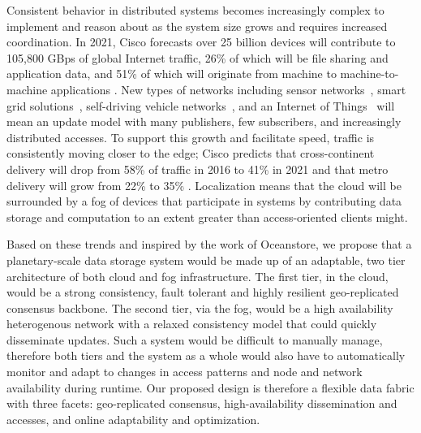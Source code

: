Consistent behavior in distributed systems becomes increasingly complex to implement and reason about as the system size grows and requires increased coordination.
In 2021, Cisco forecasts over 25 billion devices will contribute to 105,800 GBps of global Internet traffic, 26\% of which will be file sharing and application data, and 51\% of which will originate from machine to machine-to-machine applications \cite{cisco_internet_trends}.
New types of networks including sensor networks~\cite{sensor_networks}, smart grid solutions~\cite{smart_grid}, self-driving vehicle networks~\cite{sotis}, and an Internet of Things~\cite{iot} will mean an update model with many publishers, few subscribers, and increasingly distributed accesses.
To support this growth and facilitate speed, traffic is consistently moving closer to the edge; Cisco predicts that cross-continent delivery will drop from 58\% of traffic in 2016 to 41\% in 2021 and that metro delivery will grow from 22\% to 35\% \cite{cisco_internet_trends}.
Localization means that the cloud will be surrounded by a fog of devices that participate in systems by contributing data storage and computation to an extent greater than access-oriented clients might.

Based on these trends and inspired by the work of Oceanstore, we propose that a planetary-scale data storage system would be made up of an adaptable, two tier architecture of both cloud and fog infrastructure.
The first tier, in the cloud, would be a strong consistency, fault tolerant and highly resilient geo-replicated consensus backbone.
The second tier, via the fog, would be a high availability heterogenous network with a relaxed consistency model that could quickly disseminate updates.
Such a system would be difficult to manually manage, therefore both tiers and the system as a whole would also have to automatically monitor and adapt to changes in access patterns and node and network availability during runtime.
Our proposed design is therefore a flexible data fabric with three facets: geo-replicated consensus, high-availability dissemination and accesses, and online adaptability and optimization.

